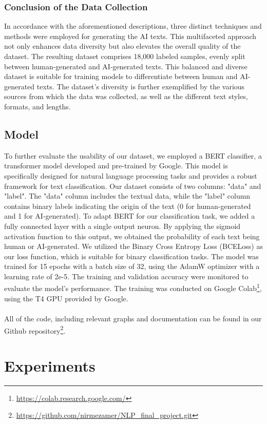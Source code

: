 \documentclass[11pt]{article}
\begin{document}
\subsubsection{Conclusion of the Data Collection}
In accordance with the aforementioned descriptions, three distinct techniques and methods were employed for generating the AI texts. This multifaceted approach not only enhances data diversity but also elevates the overall quality of the dataset. The resulting dataset comprises 18,000 labeled samples, evenly split between human-generated and AI-generated texts. This balanced and diverse dataset is suitable for training models to differentiate between human and AI-generated texts. The dataset's diversity is further exemplified by the various sources from which the data was collected, as well as the different text styles, formats, and lengths.
\subsection{Model}
To further evaluate the usability of our dataset, we employed a BERT classifier, a transformer model developed and pre-trained by Google. This model is specifically designed for natural language processing tasks and provides a robust framework for text classification.
Our dataset consists of two columns: "data" and "label". The "data" column includes the textual data, while the "label" column contains binary labels indicating the origin of the text (0 for human-generated and 1 for AI-generated). To adapt BERT for our classification task, we added a fully connected layer with a single output neuron. By applying the sigmoid activation function to this output, we obtained the probability of each text being human or AI-generated.
We utilized the Binary Cross Entropy Loss (BCELoss) as our loss function, which is suitable for binary classification tasks. The model was trained for 15 epochs with a batch size of 32, using the AdamW optimizer with a learning rate of 2e-5. The training and validation accuracy were monitored to evaluate the model's performance. The training was conducted on Google Colab\footnote{\url{https://colab.research.google.com/}}, using the T4 GPU provided by Google.\\\\
All of the code, including relevant graphs and documentation can be found in our Github repository\footnote{\url{https://github.com/nirmezamer/NLP_final_project.git}}.

\section{Experiments}
\end{document}
